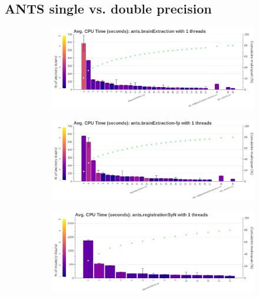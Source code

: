 \documentclass[conference]{IEEEtran}
\begin{document}
		
\subsection{ANTS single vs. double precision}
\begin{figure}[ht!]
	\centering
	\begin{subfigure}[t]{0.49\textwidth}
		\caption{}
		\label{subfig:hotspots-ants-brainExtraction}
		\includegraphics[width=\textwidth]{figures/hotspots-1thread-ants-brainExtraction.png}
	\end{subfigure}
	\hfill
	\begin{subfigure}[t]{0.49\textwidth}
		\caption{}
		\label{subfig:hotspots-ants-brainExtraction-fp}
		\includegraphics[width=\textwidth]{figures/hotspots-1thread-ants-brainExtraction-fp.png}
	\end{subfigure}
	\begin{subfigure}[t]{0.49\textwidth}
		\caption{}
		\label{subfig:hotspots-ants-registrationSyN}
		\includegraphics[width=\textwidth]{figures/hotspots-1thread-ants-registrationSyN.png}

\end{subfigure}
\end{figure}
\end{document}
